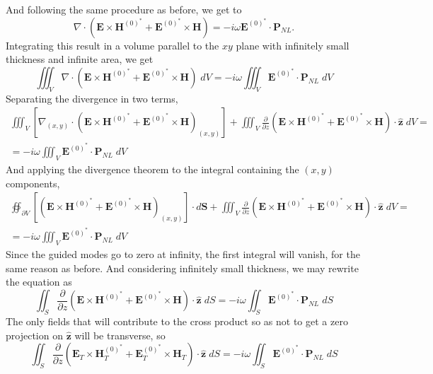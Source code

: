 And following the same procedure as before, we get to
\begin{equation}
    \nabla\cdot\left(\textbf{E}\times\textbf{H}^{(0)^*}+\textbf{E}^{(0)^*}\times\textbf{H}\right)=-i\omega\textbf{E}^{(0)^*}\cdot\textbf{P}_{NL}.
\end{equation}
Integrating this result in a volume parallel to the $xy$ plane with infinitely small thickness and infinite area, we get
\begin{equation}
    \iiint_V\nabla\cdot\left(\textbf{E}\times\textbf{H}^{(0)^*}+\textbf{E}^{(0)^*}\times\textbf{H}\right)\;dV=-i\omega\iiint_V\textbf{E}^{(0)^*}\cdot\textbf{P}_{NL}\;dV
\end{equation}
Separating the divergence in two terms,
\begin{multline*}
    \iiint_V\left[\nabla_{(x,y)}\cdot\left(\textbf{E}\times\textbf{H}^{(0)^*}+\textbf{E}^{(0)^*}\times\textbf{H}\right)_{(x,y)}\right]+\iiint_V\frac{\partial}{\partial z}\left(\textbf{E}\times\textbf{H}^{(0)^*}+\textbf{E}^{(0)^*}\times\textbf{H}\right)\cdot\hat{\textbf{z}}\;dV=\\
    =-i\omega\iiint_V\textbf{E}^{(0)^*}\cdot\textbf{P}_{NL}\;dV
\end{multline*}
And applying the divergence theorem to the integral containing the $(x,y)$ components,
\begin{multline*}
    \oiint_{\partial V}\left[\left(\textbf{E}\times\textbf{H}^{(0)^*}+\textbf{E}^{(0)^*}\times\textbf{H}\right)_{(x,y)}\right]\cdot d\textbf{S}+\iiint_V\frac{\partial}{\partial z}\left(\textbf{E}\times\textbf{H}^{(0)^*}+\textbf{E}^{(0)^*}\times\textbf{H}\right)\cdot\hat{\textbf{z}}\;dV=\\
    =-i\omega\iiint_V\textbf{E}^{(0)^*}\cdot\textbf{P}_{NL}\;dV
\end{multline*}
Since the guided modes go to zero at infinity, the first integral will vanish, for the same reason as before. And considering infinitely small thickness, we may rewrite the equation as
\begin{equation}
    \iint_S\frac{\partial}{\partial z}\left(\textbf{E}\times\textbf{H}^{(0)^*}+\textbf{E}^{(0)^*}\times\textbf{H}\right)\cdot\hat{\textbf{z}}\;dS  =-i\omega\iint_S\textbf{E}^{(0)^*}\cdot\textbf{P}_{NL}\;dS
\end{equation}
The only fields that will contribute to the cross product so as not to get a zero projection on $\hat{\textbf{z}}$ will be transverse, so
\begin{equation}
    \iint_S\frac{\partial}{\partial z}\left(\textbf{E}_T\times\textbf{H}_T^{(0)^*}+\textbf{E}_T^{(0)^*}\times\textbf{H}_T\right)\cdot\hat{\textbf{z}}\;dS  =-i\omega\iint_S\textbf{E}^{(0)^*}\cdot\textbf{P}_{NL}\;dS
\end{equation}
